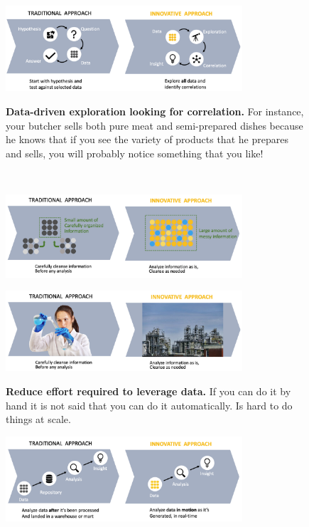 \documentclass[10pt,a4paper]{article}
\begin{document}
\begin{figure}[h!]
 \hfill \includegraphics[width=250pt]{images/new-2.png}\hspace*{\fill}
  \label{fig:new2}
  \caption{\textbf{Data-driven exploration looking for correlation.} For instance, your butcher sells both pure meat and semi-prepared dishes because he knows that if you see the variety of products that he prepares and sells, you will probably notice something that you like!}
\end{figure}
 \\
  \pagebreak
\begin{figure}[h!]
 \hfill \includegraphics[width=250pt]{images/new-3.png}\hspace*{\fill}
  \label{fig:new3}
\end{figure}
\begin{figure}[h!]
 \hfill \includegraphics[width=250pt]{images/new-33.png}\hspace*{\fill}
  \label{fig:new33}
  \caption{\textbf{Reduce effort required to leverage data.} If you can do it by hand it is not said that you can do it automatically. Is hard to do things at scale.}
  \end{figure}
  \begin{figure}[h!]
 \hfill \includegraphics[width=250pt]{images/new-4.png}\hspace*{\fill}
  \label{fig:new4}
\end{figure}
\end{document}
